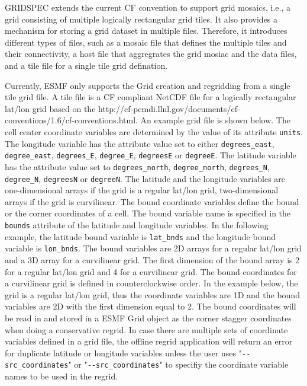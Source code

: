 GRIDSPEC extends the current CF convention to support grid  mosaics, i.e., a grid consisting of multiple logically
rectangular grid tiles. It also provides a mechanism for storing a grid dataset in multiple files.  Therefore,
it introduces different types of files, such as a mosaic file that defines the multiple tiles and their
connectivity, a host file that aggregrates the grid mosiac and the data files, and a tile file for a single tile
grid defination.

Currently, ESMF only supports the Grid creation and regridding from a single tile grid file.  A tile file
is a CF compliant NetCDF file for a logically rectangular lat/lon grid based on the
 {http://cf-pcmdi.llnl.gov/documents/cf-conventions/1.6/cf-conventions.html}.   An example grid file is shown below.
The cell center coordinate variables are determined by the value of its attribute {\tt units}.  The longitude
variable has the attribute value set to either {\tt degrees\_east}, {\tt degree\_east}, {\tt degrees\_E}, {\tt degree\_E},
{\tt degreesE} or {\tt degreeE}.  The latitude variable has the attribute value set to {\tt degrees\_north}, {\tt degree\_north}, {\tt degrees\_N},
{\tt degree\_N}, {\tt degreesN} or {\tt degreeN}.   The latitude and the longitude variables are one-dimensional arrays if the grid is a regular lat/lon grid, two-dimensional arrays if the grid is curvilinear. The bound coordinate
variables define the bound or the corner coordinates of a cell.  The bound variable name is specified in the
{\tt bounds} attribute of the latitude and longitude variables.  In the following example, the latitude bound
variable is {\tt lat\_bnds} and the longitude bound variable is {\tt lon\_bnds}.  The bound variables are 2D
arrays for a regular lat/lon grid and a 3D array for a curvilinear grid.  The first dimension of the bound
array is 2 for a regular lat/lon grid and 4 for a curvilinear grid.  The bound coordinates for a curvilinear
grid is defined in counterclockwise order.  In the example below, the grid is a regular lat/lon
grid, thus the coordinate variables are 1D and the bound variables are 2D with the first dimension equal to 2.
The bound coordinates will be read in and stored in a ESMF Grid object as the corner stagger coordinates when doing a conservative regrid.  In case there are multiple sets of coordinate variables defined in a grid file,
the offline regrid application will return an error for duplicate latitude or longitude variables unless the user
uses "{\tt \verb+--+src\_coordinates}" or "{\tt \verb+--+src\_coordinates}" to specifiy the coordinate variable names
to be used in the regrid.

